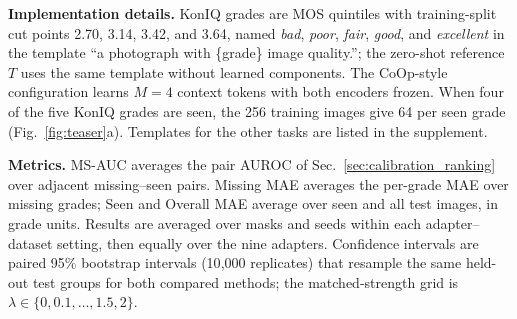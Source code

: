 \noindent\textbf{Implementation details.}
KonIQ grades are MOS quintiles with training-split cut points 2.70, 3.14, 3.42, and 3.64, named \emph{bad}, \emph{poor}, \emph{fair}, \emph{good}, and \emph{excellent} in the template ``a photograph with \{grade\} image quality.''; the zero-shot reference $T$ uses the same template without learned components.
The CoOp-style configuration learns $M=4$ context tokens with both encoders frozen.
When four of the five KonIQ grades are seen, the 256 training images give 64 per seen grade (Fig.~\ref{fig:teaser}a).
Templates for the other tasks are listed in the supplement.

\noindent\textbf{Metrics.}
MS-AUC averages the pair AUROC of Sec.~\ref{sec:calibration_ranking} over adjacent missing--seen pairs.
Missing MAE averages the per-grade MAE over missing grades; Seen and Overall MAE average over seen and all test images, in grade units.
Results are averaged over masks and seeds within each adapter--dataset setting, then equally over the nine adapters.
Confidence intervals are paired 95\% bootstrap intervals (10{,}000 replicates) that resample the same held-out test groups for both compared methods; the matched-strength grid is $\lambda\in\{0,0.1,\ldots,1.5,2\}$.


